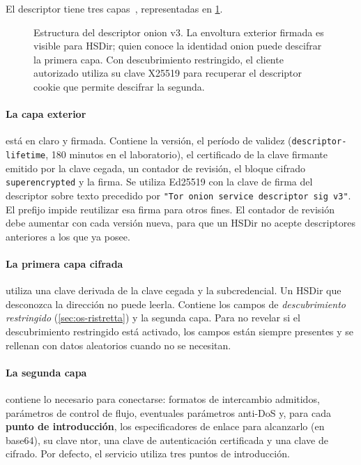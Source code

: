 El descriptor tiene tres capas~, representadas en \cref{fig:os-descrittore}.

\begin{figure}[htbp]
\centering

\caption{Estructura del descriptor onion v3. La envoltura exterior firmada es visible para HSDir; quien conoce la identidad onion puede descifrar la primera capa. Con descubrimiento restringido, el cliente autorizado utiliza su clave X25519 para recuperar el descriptor cookie que permite descifrar la segunda.}
\label{fig:os-descrittore}
\end{figure}

\paragraph{La capa exterior} está en claro y firmada. Contiene la versión, el período de validez (\texttt{descriptor-lifetime}, 180 minutos en el laboratorio), el certificado de la clave firmante emitido por la clave cegada, un contador de revisión, el bloque cifrado \texttt{superencrypted} y la firma. Se utiliza Ed25519 con la clave de firma del descriptor sobre texto precedido por \texttt{"Tor onion service descriptor sig v3"}. El prefijo impide reutilizar esa firma para otros fines. El contador de revisión debe aumentar con cada versión nueva, para que un HSDir no acepte descriptores anteriores a los que ya posee.

\paragraph{La primera capa cifrada} utiliza una clave derivada de la clave cegada y la subcredencial. Un HSDir que desconozca la dirección no puede leerla. Contiene los campos de \emph{descubrimiento restringido} (\cref{sec:os-ristretta}) y la segunda capa. Para no revelar si el descubrimiento restringido está activado, los campos están siempre presentes y se rellenan con datos aleatorios cuando no se necesitan.

\paragraph{La segunda capa} contiene lo necesario para conectarse: formatos de intercambio admitidos, parámetros de control de flujo, eventuales parámetros anti-DoS y, para cada \textbf{punto de introducción}, los especificadores de enlace para alcanzarlo (en base64), su clave ntor, una clave de autenticación certificada y una clave de cifrado. Por defecto, el servicio utiliza tres puntos de introducción.

